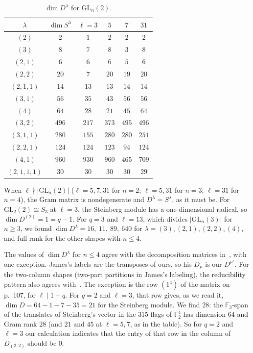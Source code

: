 \documentclass[11pt, letterpaper]{amsart}
\theoremstyle{definition}
\theoremstyle{remark}
\newcommand{\FF}{\mathbb{F}}
\newcommand{\GL}{\mathrm{GL}}
\begin{document}
\begin{table}[h]
\centering
\caption{$\dim D^\lambda$ for $\GL_n(2)$.}\label{tabD}
\begin{tabular}{c|c|cccc}
$\lambda$ & $\dim S^\lambda$ & $\ell=3$ & $5$ & $7$ & $31$\\\hline
$(2)$ & $2$ & $1$ & $2$ & $2$ & $2$\\
$(3)$ & $8$ & $7$ & $8$ & $3$ & $8$\\
$(2,1)$ & $6$ & $6$ & $6$ & $5$ & $6$\\
$(2,2)$ & $20$ & $7$ & $20$ & $19$ & $20$\\
$(2,1,1)$ & $14$ & $13$ & $13$ & $14$ & $14$\\
$(3,1)$ & $56$ & $35$ & $43$ & $56$ & $56$\\
$(4)$ & $64$ & $28$ & $21$ & $45$ & $64$\\
$(3,2)$ & $496$ & $217$ & $373$ & $495$ & $496$\\
$(3,1,1)$ & $280$ & $155$ & $280$ & $280$ & $251$\\
$(2,2,1)$ & $124$ & $124$ & $123$ & $94$ & $124$\\
$(4,1)$ & $960$ & $930$ & $960$ & $465$ & $709$\\
$(2,1,1,1)$ & $30$ & $30$ & $30$ & $30$ & $29$\\
\end{tabular}
\end{table}

When $\ell\nmid|\GL_n(2)|$ ($\ell=5,7,31$ for $n=2$; $\ell=5,31$ for $n=3$; $\ell=31$ for $n=4$), the Gram matrix is nondegenerate and $D^\lambda=S^\lambda$, as it must be. For $\GL_2(2)\cong S_3$ at $\ell=3$, the Steinberg module has a one-dimensional radical, so $\dim D^{(2)}=1=q-1$. For $q=3$ and $\ell=13$, which divides $|\GL_n(3)|$ for $n\ge3$, we found $\dim D^\lambda=16,\ 11,\ 89,\ 640$ for $\lambda=(3),(2,1),(2,2),(4)$, and full rank for the other shapes with $n\le4$.

The values of $\dim D^\lambda$ for $n\le4$ agree with the decomposition matrices in~\cite[pp.~106--108]{James84}, with one exception. James's labels are the transposes of ours, so his $D_\mu$ is our $D^{\mu'}$. For the two-column shapes (two-part partitions in James's labeling), the reducibility pattern also agrees with~\cite[Thm.~20.3]{James84}. The exception is the row $(1^4)$ of the matrix on p.~107, for $\ell\mid1+q$. For $q=2$ and $\ell=3$, that row gives, as we read it, $\dim D=64-1-7-35=21$ for the Steinberg module. We find $28$: the $\FF_3$-span of the translates of Steinberg's vector in the $315$ flags of $\FF_2^4$ has dimension $64$ and Gram rank $28$ (and $21$ and $45$ at $\ell=5,7$, as in the table). So for $q=2$ and $\ell=3$ our calculation indicates that the entry of that row in the column of $D_{(2,2)}$ should be $0$.
\end{document}
